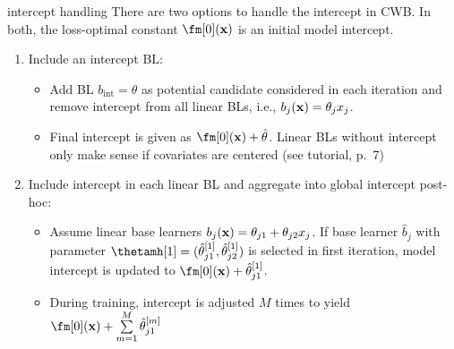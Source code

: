 \documentclass[11pt,compress,t,notes=noshow, xcolor=table]{beamer}
\begin{document}
\begin{vbframe}{intercept handling}
There are two options to handle the intercept in CWB. In both, the loss-optimal constant $\fm[0](\xv)$ is an initial model intercept. \\
\begin{enumerate}
\setlength{\itemsep}{0.8em}
\item {\small Include an intercept BL}:
  \begin{itemize}
    \setlength{\itemsep}{0.8em}
    \item {\footnotesize Add BL $b_{\text{int}} = \theta$ as potential candidate considered in each iteration and remove intercept from all linear BLs, i.e., $b_j(\mathbf{x}) = \theta_j x_j$.}
    \item {\footnotesize Final intercept is given as $\fm[0](\xv) + \hat{\theta}$. Linear BLs without intercept only make sense if covariates are centered (see  tutorial, p.~7)}
  \end{itemize}
  
  
  \item {\small Include intercept in each linear BL and aggregate into global intercept post-hoc}:
  \begin{itemize} \setlength{\itemsep}{0.8em}
  \item  {\footnotesize Assume linear base learners $b_j(\mathbf{x}) = \theta_{j1} + \theta_{j2} x_j$. %
  If base learner $\hat{b}_j$ with parameter $\thetamh[1] = (\hat{\theta}_{j1}^{[1]}, \hat{\theta}_{j2}^{[1]})$ is selected in first iteration, model intercept is updated to $\fm[0](\xv) + \hat{\theta}_{j1}^{[1]}$.}
    \item {\footnotesize During training, intercept is adjusted $M$ times to yield $\fm[0](\xv) + \sum\limits_{m=1}^M %
    \hat{\theta}^{[m]}_{j1}$}
    \end{itemize}
\end{enumerate}

\end{vbframe}
\end{document}
